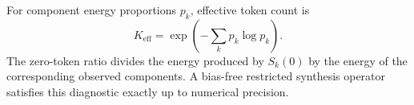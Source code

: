 For component energy proportions $p_k$, effective token count is
\begin{equation}
  K_{\mathrm{eff}}=\exp\!\left(-\sum_k p_k\log p_k\right).
\end{equation}
The zero-token ratio divides the energy produced by $S_k(0)$ by the energy of
the corresponding observed components. A bias-free restricted synthesis
operator satisfies this diagnostic exactly up to numerical precision.
